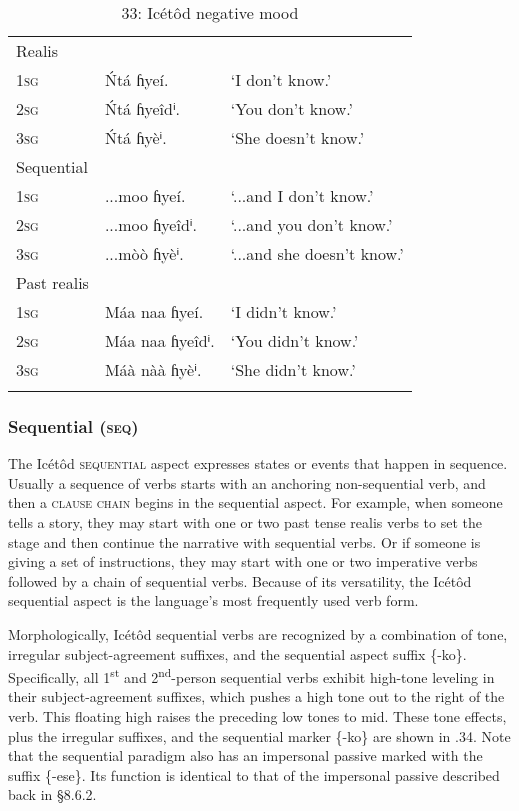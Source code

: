 \begin{table}
\caption{33: Icétôd negative mood}
\label{tab:8}


\begin{tabularx}{\textwidth}{XXX}
\lsptoprule

Realis &  & \\
\textsc{1sg} & \'{N}tá ɦyeí. & ‘I don’t know.’\\
\textsc{2sg} & \'{N}tá ɦyeîdⁱ. & ‘You don’t know.’\\
\textsc{3sg} & \'{N}tá ɦyèⁱ. & ‘She doesn’t know.’\\
Sequential &  & \\
\textsc{1sg} & ...moo ɦyeí. & ‘...and I don’t know.’\\
\textsc{2sg} & ...moo ɦyeîdⁱ. & ‘...and you don’t know.’\\
\textsc{3sg} & ...mòò ɦyèⁱ. & ‘...and she doesn’t know.’\\
Past realis &  & \\
\textsc{1sg} & Máa naa ɦyeí. & ‘I didn’t know.’\\
\textsc{2sg} & Máa naa ɦyeîdⁱ. & ‘You didn’t know.’\\
\textsc{3sg} & Máà nàà ɦyèⁱ. & ‘She didn’t know.’\\
\lspbottomrule
\end{tabularx}
\end{table}

\subsubsection{Sequential (\textsc{seq})}

The Icétôd \textsc{sequential} aspect expresses states or events that happen in sequence. Usually a sequence of verbs starts with an anchoring non-sequential verb, and then a \textsc{clause} \textsc{chain} begins in the sequential aspect. For example, when someone tells a story, they may start with one or two past tense realis verbs to set the stage and then continue the narrative with sequential verbs. Or if someone is giving a set of instructions, they may start with one or two imperative verbs followed by a chain of sequential verbs. Because of its versatility, the Icétôd sequential aspect is the language’s most frequently used verb form.

Morphologically, Icétôd sequential verbs are recognized by a combination of tone, irregular subject-agreement suffixes, and the sequential aspect suffix \{-ko\}. Specifically, all 1\textsuperscript{st} and 2\textsuperscript{nd}{}-person sequential verbs exhibit high-tone leveling in their subject-agreement suffixes, which pushes a high tone out to the right of the verb. This floating high raises the preceding low tones to mid. These tone effects, plus the irregular suffixes, and the sequential marker \{-ko\} are shown in .34. Note that the sequential paradigm also has an impersonal passive marked with the suffix \{-ese\}. Its function is identical to that of the impersonal passive described back in §8.6.2.


